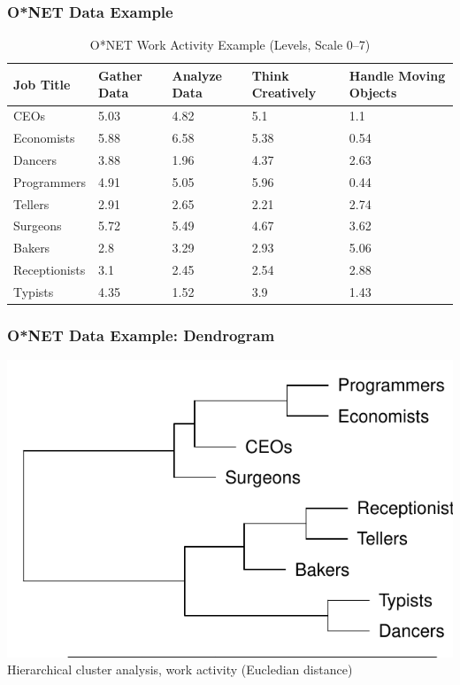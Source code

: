 \documentclass[red]{beamer}
\begin{document}
\begin{frame}
\frametitle{O*NET Data Example}
\begin{table}[htbp]
\begin{tabular}{|p{2cm}|p{1.65cm}|p{1.5cm}|p{1.5cm}|p{1.5cm}|}
\hline
{Job Title} & {Gather Data} & {Analyze Data} & {\small Think Creatively} & {Handle Moving Objects} \\ \hline
{CEOs} & 5.03 & 4.82 & 5.1 & 1.1  \\ \hline
{Economists} & 5.88 & 6.58 & 5.38 & 0.54 \\ \hline
{Dancers} & 3.88 & 1.96 & 4.37 & 2.63 \\ \hline
{Programmers} & 4.91 & 5.05 & 5.96 & 0.44 \\ \hline
{Tellers} & 2.91 & 2.65 & 2.21 & 2.74 \\ \hline
{Surgeons} & 5.72 & 5.49 & 4.67 & 3.62 \\ \hline
{Bakers} & 2.8 & 3.29 & 2.93 & 5.06 \\ \hline
{Receptionists} & 3.1 & 2.45 & 2.54 & 2.88 \\ \hline
{Typists} & 4.35 & 1.52 & 3.9 & 1.43 \\ \hline
\end{tabular}
\caption{O*NET Work Activity Example (Levels, Scale 0--7)}
\label{onetex}
\end{table}
\end{frame}

\begin{frame}
  \frametitle{O*NET Data Example: Dendrogram}
  \begin{center}
  \includegraphics[width=\textwidth]{slides/example_cluster.pdf} \\
  Hierarchical cluster analysis, work activity (Eucledian distance)
  \end{center}
\end{frame}
\end{document}

